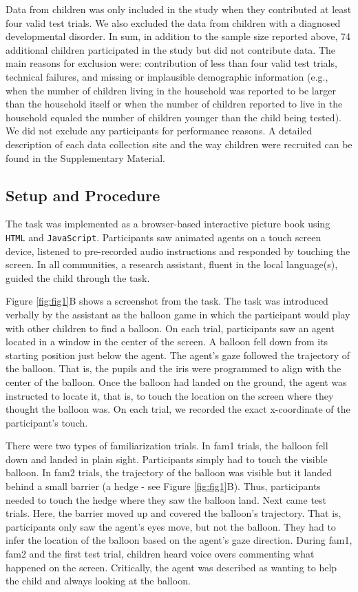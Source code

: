 \documentclass[
  man,floatsintext]{apa6}
\begin{document}
Data from children was only included in the study when they contributed at least four valid test trials. We also excluded the data from children with a diagnosed developmental disorder. In sum, in addition to the sample size reported above, 74 additional children participated in the study but did not contribute data. The main reasons for exclusion were: contribution of less than four valid test trials, technical failures, and missing or implausible demographic information (e.g., when the number of children living in the household was reported to be larger than the household itself or when the number of children reported to live in the household equaled the number of children younger than the child being tested). We did not exclude any participants for performance reasons. A detailed description of each data collection site and the way children were recruited can be found in the Supplementary Material.

\hypertarget{setup-and-procedure}{%
\subsection{Setup and Procedure}\label{setup-and-procedure}}

The task was implemented as a browser-based interactive picture book using \texttt{HTML} and \texttt{JavaScript}. Participants saw animated agents on a touch screen device, listened to pre-recorded audio instructions and responded by touching the screen. In all communities, a research assistant, fluent in the local language(s), guided the child through the task.

Figure \ref{fig:fig1}B shows a screenshot from the task. The task was introduced verbally by the assistant as the balloon game in which the participant would play with other children to find a balloon. On each trial, participants saw an agent located in a window in the center of the screen. A balloon fell down from its starting position just below the agent. The agent's gaze followed the trajectory of the balloon. That is, the pupils and the iris were programmed to align with the center of the balloon. Once the balloon had landed on the ground, the agent was instructed to locate it, that is, to touch the location on the screen where they thought the balloon was. On each trial, we recorded the exact x-coordinate of the participant's touch.

There were two types of familiarization trials. In fam1 trials, the balloon fell down and landed in plain sight. Participants simply had to touch the visible balloon. In fam2 trials, the trajectory of the balloon was visible but it landed behind a small barrier (a hedge - see Figure \ref{fig:fig1}B). Thus, participants needed to touch the hedge where they saw the balloon land. Next came test trials. Here, the barrier moved up and covered the balloon's trajectory. That is, participants only saw the agent's eyes move, but not the balloon. They had to infer the location of the balloon based on the agent's gaze direction. During fam1, fam2 and the first test trial, children heard voice overs commenting what happened on the screen. Critically, the agent was described as wanting to help the child and always looking at the balloon.
\end{document}
